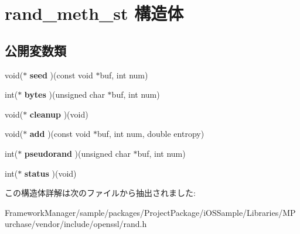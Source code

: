 \hypertarget{structrand__meth__st}{}\section{rand\+\_\+meth\+\_\+st 構造体}
\label{structrand__meth__st}
\subsection*{公開変数類}
\begin{DoxyCompactItemize}
\item 
\hypertarget{structrand__meth__st_ac5982cb0ac2304a601df7fb009624ec9}{}void($\ast$ {\bfseries seed} )(const void $\ast$buf, int num)\label{structrand__meth__st_ac5982cb0ac2304a601df7fb009624ec9}

\item 
\hypertarget{structrand__meth__st_a41a49e87fa960f2e4f46fec63044ad8d}{}int($\ast$ {\bfseries bytes} )(unsigned char $\ast$buf, int num)\label{structrand__meth__st_a41a49e87fa960f2e4f46fec63044ad8d}

\item 
\hypertarget{structrand__meth__st_ab043138ccf85baf2d6f12ab1e5011dff}{}void($\ast$ {\bfseries cleanup} )(void)\label{structrand__meth__st_ab043138ccf85baf2d6f12ab1e5011dff}

\item 
\hypertarget{structrand__meth__st_a5587c9d9c28a2abf0136fcc499028f5b}{}void($\ast$ {\bfseries add} )(const void $\ast$buf, int num, double entropy)\label{structrand__meth__st_a5587c9d9c28a2abf0136fcc499028f5b}

\item 
\hypertarget{structrand__meth__st_a5e7b24146c610773f7eb0470e54b1408}{}int($\ast$ {\bfseries pseudorand} )(unsigned char $\ast$buf, int num)\label{structrand__meth__st_a5e7b24146c610773f7eb0470e54b1408}

\item 
\hypertarget{structrand__meth__st_ab7591ea659457fcd115d7dc0a4e54125}{}int($\ast$ {\bfseries status} )(void)\label{structrand__meth__st_ab7591ea659457fcd115d7dc0a4e54125}

\end{DoxyCompactItemize}


この構造体詳解は次のファイルから抽出されました\+:\begin{DoxyCompactItemize}
\item 
Framework\+Manager/sample/packages/\+Project\+Package/i\+O\+S\+Sample/\+Libraries/\+M\+Purchase/vendor/include/openssl/rand.\+h\end{DoxyCompactItemize}
